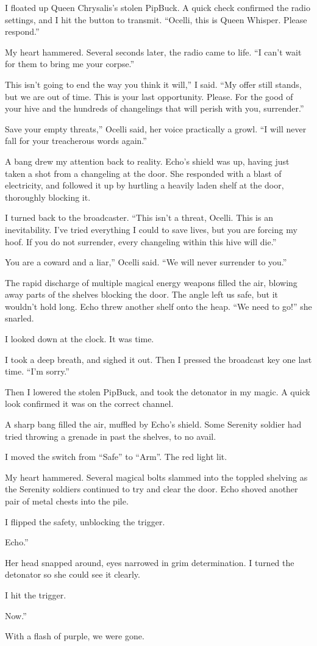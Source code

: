 I floated up Queen Chrysalis’s stolen PipBuck. A quick check confirmed the radio settings, and I hit the button to transmit. “Ocelli, this is Queen Whisper. Please respond.”

My heart hammered. Several seconds later, the radio came to life. “I can’t wait for them to bring me your corpse.”

\leavevmode{}This isn’t going to end the way you think it will,” I said. “My offer still stands, but we are out of time. This is your last opportunity. Please. For the good of your hive and the hundreds of changelings that will perish with you, surrender.”

\leavevmode{}Save your empty threats,” Ocelli said, her voice practically a growl. “I will never fall for your treacherous words again.”

A bang drew my attention back to reality. Echo’s shield was up, having just taken a shot from a changeling at the door. She responded with a blast of electricity, and followed it up by hurtling a heavily laden shelf at the door, thoroughly blocking it.

I turned back to the broadcaster. “This isn’t a threat, Ocelli. This is an inevitability. I’ve tried everything I could to save lives, but you are forcing my hoof. If you do not surrender, every changeling within this hive will die.”

\leavevmode{}You are a coward and a liar,” Ocelli said. “We will never surrender to you.”

The rapid discharge of multiple magical energy weapons filled the air, blowing away parts of the shelves blocking the door. The angle left us safe, but it wouldn’t hold long. Echo threw another shelf onto the heap. “We need to go!” she snarled.

I looked down at the clock. It was time.

I took a deep breath, and sighed it out. Then I pressed the broadcast key one last time. “I’m sorry.”

Then I lowered the stolen PipBuck, and took the detonator in my magic. A quick look confirmed it was on the correct channel.

A sharp bang filled the air, muffled by Echo’s shield. Some Serenity soldier had tried throwing a grenade in past the shelves, to no avail.

I moved the switch from “Safe” to “Arm”. The red light lit.

My heart hammered. Several magical bolts slammed into the toppled shelving as the Serenity soldiers continued to try and clear the door. Echo shoved another pair of metal chests into the pile.

I flipped the safety, unblocking the trigger.

\leavevmode{}Echo.”

Her head snapped around, eyes narrowed in grim determination. I turned the detonator so she could see it clearly.

I hit the trigger.

\leavevmode{}Now.”

With a flash of purple, we were gone.
